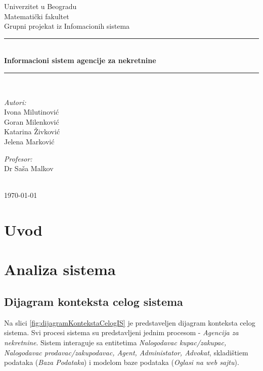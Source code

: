 \documentclass{article}
\begin{document}
\begin{titlepage}

\newcommand{\HRule}{\rule{\linewidth}{0.5mm}}
\center
\textup{\Large Univerzitet u Beogradu\\Matemati\v{c}ki fakultet}\\[1.5cm]
\textup{\Large Grupni projekat iz Infomacionih sistema}\\[0.4cm]

\HRule \\[0.4cm]
{ \huge \bfseries Informacioni sistem agencije za nekretnine}\\[0.4cm]
\HRule \\[8.5cm]

\begin{minipage}{0.4\textwidth}
\begin{flushleft}
\large
\emph{Autori:}\\
\textup Ivona Milutinovi\' c\\
\textup Goran Milenkovi\' c\\
\textup Katarina \v Zivkovi\' c\\
\textup Jelena Markovi\' c

\end{flushleft}
\end{minipage}
\hfill
\begin{minipage}{0.4\textwidth}
\begin{flushright}
\large
\emph{Profesor:} \\
\textup Dr Sa\v sa Malkov\\
\end{flushright}
\end{minipage}\\[2cm]


{\textup \large \today}\\[1cm]

\end{titlepage}

\newpage
\tableofcontents

\newpage
\section{\bfseries Uvod}

\newpage
\section{\bfseries Analiza sistema}

\subsection{\bfseries Dijagram konteksta celog sistema}
Na slici \ref{fig:dijagramKontekstaCelogIS} je predstaveljen dijagram konteksta celog sistema. Svi procesi sistema su predstavljeni jednim procesom - {\it Agencija za nekretnine}. Sistem interaguje sa entitetima {\it Nalogodavac kupac/zakupac, Nalogodavac prodavac/zakupodavac, Agent, Administator, Advokat}, skladi\v{s}tiem podataka ({\it Baza Podataka}) i modelom baze podataka ({\it Oglasi na web sajtu}).
\end{document}
